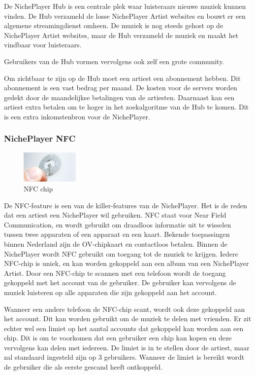 De NichePlayer Hub is een centrale plek waar luisteraars nieuwe muziek kunnen vinden. De Hub verzameld de losse NichePlayer Artist websites en bouwt er een algemene streamingdienst omheen. De muziek is nog steeds gehost op de NichePlayer Artist websites, maar de Hub verzameld de muziek en maakt het vindbaar voor luisteraars.

Gebruikers van de Hub vormen vervolgens ook zelf een grote community. 

Om zichtbaar te zijn op de Hub moet een artiest een abonnement hebben. Dit abonnement is een vast bedrag per maand. De kosten voor de servers worden gedekt door de maandelijkse betalingen van de artiesten. Daarnaast kan een artiest extra betalen om te hoger in het zoekalgoritme van de Hub te komen. Dit is een extra inkomstenbron voor de NichePlayer.

\subsubsection*{NichePlayer NFC}
\begin{figure}
  \centering
  \includegraphics[width=0.25\textwidth]{assets/uitvoering/NFC_chips.jpg}
  \caption{NFC chip}
  \label{fig:uitvoering:NFC_chip}
\end{figure}
De NFC-feature is een van de killer-features van de NichePlayer. Het is de reden dat een artiest een NichePlayer wil gebruiken. NFC staat voor Near Field Communication, en wordt gebruikt om draadloos informatie uit te wisselen tussen twee apparaten of een apparaat en een kaart. Bekende toepassingen binnen Nederland zijn de OV-chipkaart en contactloos betalen. Binnen de NichePlayer wordt NFC gebruikt om toegang tot de muziek te krijgen. Iedere NFC-chip is uniek, en kan worden gekoppeld aan een album van een NichePlayer Artist. Door een NFC-chip te scannen met een telefoon wordt de toegang gekoppeld met het account van de gebruiker. De gebruiker kan vervolgens de muziek luisteren op alle apparaten die zijn gekoppeld aan het account.

Wanneer een andere telefoon de NFC-chip scant, wordt ook deze gekoppeld aan het account. Dit kan worden gebruikt om de muziek te delen met vrienden. Er zit echter wel een limiet op het aantal accounts dat gekoppeld kan worden aan een chip. Dit is om te voorkomen dat een gebruiker een chip kan kopen en deze vervolgens kan delen met iedereen. De limiet is in te stellen door de artiest, maar zal standaard ingesteld zijn op 3 gebruikers. Wanneer de limiet is bereikt wordt de gebruiker die als eerste gescand heeft ontkoppeld.

